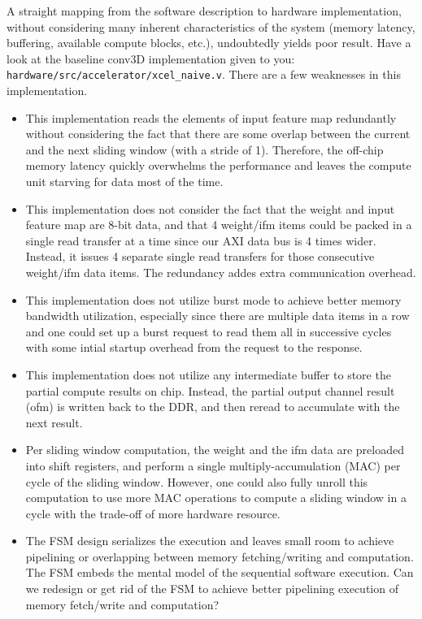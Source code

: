 \documentclass[11pt]{article}
\begin{document}
A straight mapping from the software description to hardware implementation, without considering many inherent characteristics of the system (memory latency, buffering, available compute blocks, etc.), undoubtedly yields poor result. Have a look at the baseline conv3D implementation given to you: \verb|hardware/src/accelerator/xcel_naive.v|. There are a few weaknesses in this implementation.

\begin{itemize}
\item This implementation reads the elements of input feature map redundantly without considering the fact that there are some overlap between the current and the next sliding window (with a stride of 1). Therefore, the off-chip memory latency quickly overwhelms the performance and leaves the compute unit starving for data most of the time.
\item This implementation does not consider the fact that the weight and input feature map are 8-bit data, and that 4 weight/ifm items could be packed in a single read transfer at a time since our AXI data bus is 4 times wider. Instead, it issues 4 separate single read transfers for those consecutive weight/ifm data items. The redundancy addes extra communication overhead.
\item This implementation does not utilize burst mode to achieve better memory bandwidth utilization, especially since there are multiple data items in a row and one could set up a burst request to read them all in successive cycles with some intial startup overhead from the request to the response.
\item This implementation does not utilize any intermediate buffer to store the partial compute results on chip. Instead, the partial output channel result (ofm) is written back to the DDR, and then reread to accumulate with the next result.
\item Per sliding window computation, the weight and the ifm data are preloaded into shift registers, and perform a single multiply-accumulation (MAC) per cycle of the sliding window. However, one could also fully unroll this computation to use more MAC operations to compute a sliding window in a cycle with the trade-off of more hardware resource.
\item The FSM design serializes the execution and leaves small room to achieve pipelining or overlapping between memory fetching/writing and computation. The FSM embeds the mental model of the sequential software execution. Can we redesign or get rid of the FSM to achieve better pipelining execution of memory fetch/write and computation?
\end{itemize}
\end{document}
